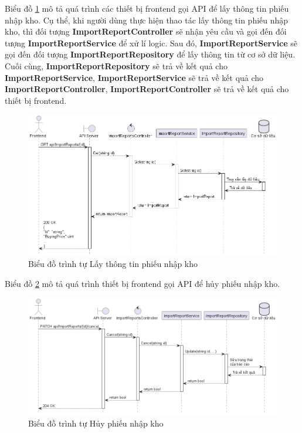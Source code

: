 \documentclass[../DoAn.tex]{subfiles}
\begin{document}
Biểu đồ \ref{figure:sd-importreport-get} mô tả quá trình các thiết bị frontend gọi API để lấy thông tin phiếu nhập kho. Cụ thể, khi người dùng thực hiện thao tác lấy thông tin phiếu nhập kho, thì đối tượng \textbf{ImportReportController} sẽ nhận yêu cầu và gọi đến đối tượng \textbf{ImportReportService} để xử lí logic. Sau đó, \textbf{ImportReportService} sẽ gọi đến đối tượng \textbf{ImportReportRepository} để lấy thông tin từ cơ sở dữ liệu. Cuối cùng, \textbf{ImportReportRepository} sẽ trả về kết quả cho \textbf{ImportReportService}, \textbf{ImportReportService} sẽ trả về kết quả cho \textbf{ImportReportController}, \textbf{ImportReportController} sẽ trả về kết quả cho thiết bị frontend.
\begin{figure}[H]
    \centering
    \includegraphics[width=1\textwidth]{Hinhve/design/class/ImportReportGETSequence}
    \caption{Biểu đồ trình tự Lấy thông tin phiếu nhập kho}
    \label{figure:sd-importreport-get}
\end{figure}

Biểu đồ \ref{figure:sd-importreport-patchcancel} mô tả quá trình thiết bị frontend gọi API để hủy phiếu nhập kho.
\begin{figure}[H]
    \centering
    \includegraphics[width=1\textwidth]{Hinhve/design/class/ImportReportPATCHCancelSequence}
    \caption{Biểu đồ trình tự Hủy phiếu nhập kho}
    \label{figure:sd-importreport-patchcancel}
\end{figure}
\break
\end{document}

